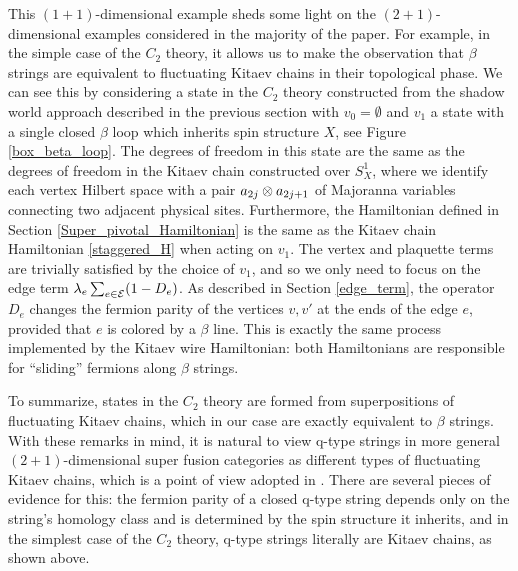 This $(1+1)$-dimensional example sheds some light on the $(2+1)$-dimensional examples 
considered in the majority of the paper. 
For example, in the simple case of the $C_2$ theory, it allows us to make the observation that
$\beta$ strings are equivalent to fluctuating Kitaev chains in their topological phase. 
We can see this by considering a state in the $C_2$ theory constructed 
from the shadow world approach described in the previous section with $v_0 = \emptyset$ and $v_1$ a state 
with a single closed $\beta$ loop which inherits spin structure $X$, see Figure \ref{box_beta_loop}.
The degrees of freedom in this state are the same as 
the degrees of freedom in the Kitaev chain constructed over $S^1_X$, 
where we identify each vertex Hilbert space with a pair $a_{2j}\otimes a_{2j+1}$ of Majoranna
variables connecting two adjacent physical sites. 
Furthermore, the Hamiltonian defined in Section \ref{Super_pivotal_Hamiltonian} is the same as the Kitaev 
chain Hamiltonian \eqref{staggered_H} when acting on $v_1$. 
The vertex and plaquette terms are trivially satisfied by the choice of $v_1$, and so we only need to focus 
on the edge term $\lambda_e \sum_{e\in \mathcal{E}} (1-D_e)$. As described in Section \ref{edge_term}, 
the operator $D_e$ changes the fermion parity of the vertices $v,v'$ at the ends of the edge $e$, provided
that $e$ is colored by a $\beta$ line. 
This is exactly the same process implemented by the Kitaev wire Hamiltonian: both Hamiltonians
 are responsible for ``sliding'' fermions along $\beta$ strings.  

To summarize, states in the $C_2$ theory are formed from superpositions of fluctuating Kitaev chains, which in our case are exactly equivalent to $\beta$ strings. 
With these remarks in mind, it 
is natural to view q-type strings in more general $(2+1)$-dimensional super fusion categories 
as different types of fluctuating Kitaev chains, which is a point of view adopted in \cite{tarantino2016,ware2016,kapustin2017}. 
There are several pieces of evidence for this: the fermion parity of a closed q-type string 
depends only on the string's homology class and is determined by the spin structure it inherits, 
and in the simplest case of the $C_2$ theory, q-type strings literally are Kitaev chains, as shown 
above. 

